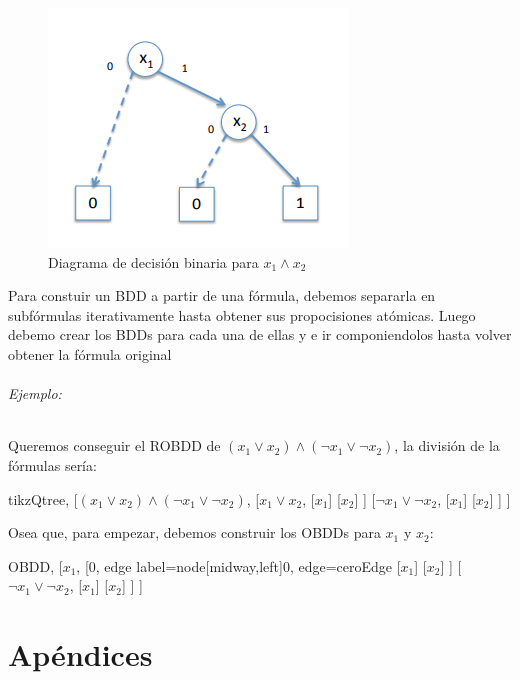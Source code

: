 \begin{figure}[h]
\centering
	\includegraphics[scale=0.5]{imagenes/bdd}
	\caption{Diagrama de decisión binaria para $x_1 \land x_2$}
\end{figure}

Para constuir un BDD a partir de una fórmula, debemos separarla en subfórmulas iterativamente hasta obtener sus propocisiones atómicas. Luego debemo crear los BDDs para cada una de ellas y e ir componiendolos hasta volver obtener la fórmula original

\paragraph{Ejemplo:} Queremos conseguir el ROBDD de $(x_1\lor x_2)\land(\lnot x_1\lor \lnot x_2)$, la división de la fórmulas sería:

\begin{center}
	\begin{forest} tikzQtree,
		[$(x_1\lor x_2)\land(\lnot x_1\lor \lnot x_2)$,
			[$x_1\lor x_2$,
				[$x_1$]
				[$x_2$]
			]
			[$\lnot x_1\lor \lnot x_2$,
				[$x_1$]
				[$x_2$]
			]
		]
	\end{forest}
\end{center}

Osea que, para empezar, debemos construir los OBDDs para $x_1$ y $x_2$:

\begin{center}
	\begin{forest} OBDD,
		[$x_1$,
			[$0$, edge label={node[midway,left]{0}}, edge=ceroEdge
				[$x_1$]
				[$x_2$]
			]
			[$\lnot x_1\lor \lnot x_2$,
				[$x_1$]
				[$x_2$]
			]
		]
	\end{forest}
\end{center}

\part{Apéndices}
\appendix
